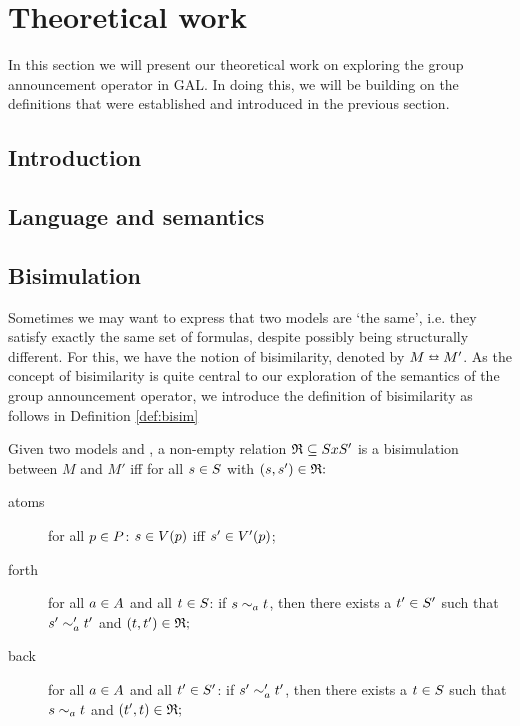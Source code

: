 \section{Theoretical work}\label{sec:theory}

In this section we will present our theoretical work on exploring the group announcement operator in GAL. In doing this, we will be building on the definitions that were established and introduced in the previous section.

\subsection{Introduction}

\subsection{Language and semantics}

\subsection{Bisimulation}


Sometimes we may want to express that two models are `the same', i.e. they satisfy exactly the same set of formulas, despite possibly being structurally different. For this, we have the notion of bisimilarity, denoted by $M \leftrightarroweq M'$. As the concept of bisimilarity is quite central to our exploration of the semantics of the group announcement operator, we introduce the definition of bisimilarity as follows in Definition \ref{def:bisim}

\begin{definition}[Bisimulation]\label{def:bisim}
	Given two models \model{} and , a non-empty relation $\mathfrak{R}\subseteq S x S '$  is a bisimulation between $M$ and $M'$ iff for all $s \in S$ with $(s,s') \in \mathfrak{R}\mathfrak{:}$
	\begin{description}
		\item[atoms] for all $p \in P$: $s\in V(p)$ iff $s'\in V '(p)$;
		\item[forth]  for all $a \in A$ and all $t \in S$: if $s\sim_a t$, then there exists a $t'\in S '$ such that $s'\sim'_a t'$ and $(t,t')\in\mathfrak{R}\mathfrak{;}$
		\item[back] for all $a \in A$ and all $t' \in S'$: if $s'\sim'_a t'$, then there exists a $t\in S $ such that $s\sim_a t$ and $(t',t)\in\mathfrak{R}\mathfrak{;}$
	\end{description}
\end{definition} 

